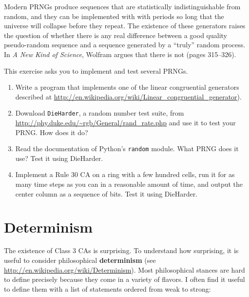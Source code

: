 \documentclass[10pt]{book}
\begin{document}
Modern PRNGs produce sequences that are statistically
indistinguishable from random, and they can be implemented with with
periods so long that the universe will collapse before they repeat.
The existence of these generators raises the question of whether there
is any real difference between a good quality pseudo-random sequence
and a sequence generated by a ``truly'' random process.  In {\em A New
  Kind of Science}, Wolfram argues that there is not (pages 315--326).

\begin{exercise}

This exercise asks you to implement and test several PRNGs.

\begin{enumerate}

\item Write a program that implements one of the linear congruential
generators described at
\url{http://en.wikipedia.org/wiki/Linear_congruential_generator}).

\item Download {\tt DieHarder}, a random number test suite, from
\url{http://phy.duke.edu/~rgb/General/rand_rate.php} and use it to
test your PRNG.  How does it do?

\item Read the documentation of Python's {\tt random} module.
What PRNG does it use?  Test it using DieHarder.

\item Implement a Rule 30 CA on a ring with a few hundred cells,
run it for as many time steps as you can in a reasonable amount
of time, and output the center column as a sequence of bits.
Test it using DieHarder.

\end{enumerate}

\end{exercise}


\section{Determinism}
\label{determinism}

The existence of Class 3 CAs is surprising.  To understand how
surprising, it is useful to consider philosophical
{\bf determinism} (see \url{http://en.wikipedia.org/wiki/Determinism}).
Most philosophical stances are hard to define precisely because
they come in a variety of flavors.  I often find it useful
to define them with a list of statements ordered from weak
to strong:
\end{document}
